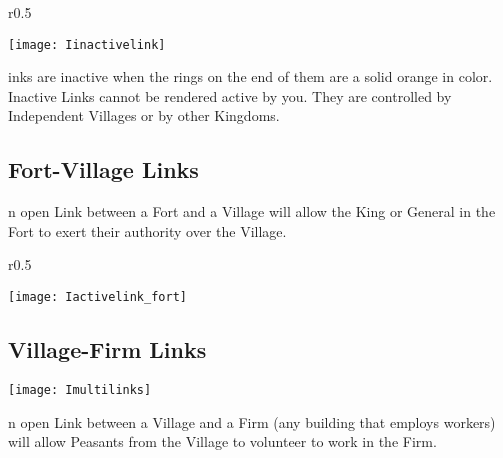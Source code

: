 
\begin{wrapfigure}{r}{0.5\textwidth}
	\vspace{-20pt}
	\begin{center}
		\texttt{[image: Iinactivelink]}
	\end{center}
	\vspace{-50pt}
\end{wrapfigure}

inks are inactive when the rings on the end of them are a solid orange in color. Inactive Links cannot be rendered active by you. They are controlled by Independent Villages or by other Kingdoms. 

\subsection{Fort-Village Links}


n open Link between a Fort and a Village will allow the King or General in the Fort to exert their authority over the Village.


\begin{wrapfigure}{r}{0.5\textwidth}
	\vspace{-20pt}
	\begin{center}
		\texttt{[image: Iactivelink\_fort]}
	\end{center}
	\vspace{-50pt}
\end{wrapfigure}

\clearpage

\subsection{Village-Firm Links}


\begin{center}
	\texttt{[image: Imultilinks]} %
\end{center}

n open Link between a Village and a Firm (any building that employs workers) will allow Peasants from the Village to volunteer to work in the Firm.

